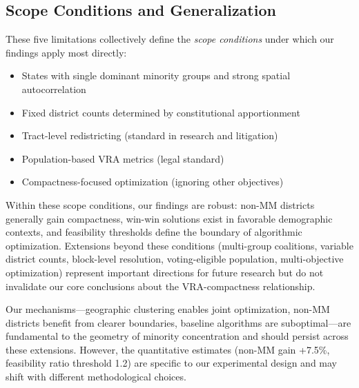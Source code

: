 \subsection{Scope Conditions and Generalization}

These five limitations collectively define the \emph{scope conditions} under which our findings apply most directly:
\begin{itemize}
    \item States with single dominant minority groups and strong spatial autocorrelation
    \item Fixed district counts determined by constitutional apportionment
    \item Tract-level redistricting (standard in research and litigation)
    \item Population-based VRA metrics (legal standard)
    \item Compactness-focused optimization (ignoring other objectives)
\end{itemize}

Within these scope conditions, our findings are robust: non-MM districts generally gain compactness, win-win solutions exist in favorable demographic contexts, and feasibility thresholds define the boundary of algorithmic optimization. Extensions beyond these conditions (multi-group coalitions, variable district counts, block-level resolution, voting-eligible population, multi-objective optimization) represent important directions for future research but do not invalidate our core conclusions about the VRA-compactness relationship.

Our mechanisms---geographic clustering enables joint optimization, non-MM districts benefit from clearer boundaries, baseline algorithms are suboptimal---are fundamental to the geometry of minority concentration and should persist across these extensions. However, the quantitative estimates (non-MM gain +7.5\%, feasibility ratio threshold 1.2) are specific to our experimental design and may shift with different methodological choices.
